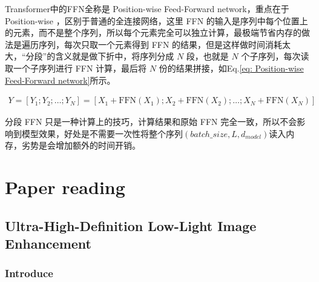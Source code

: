 \documentclass[letterpaper,10pt]{article}
\begin{document}
	Transformer中的FFN全称是 Position-wise Feed-Forward network，重点在于 Position-wise ，区别于普通的全连接网络，这里 FFN 的输入是序列中每个位置上的元素，而不是整个序列，所以每个元素完全可以独立计算，最极端节省内存的做法是遍历序列，每次只取一个元素得到 FFN 的结果，但是这样做时间消耗太大，“分段”的含义就是做下折中，将序列分成 $N$ 段，也就是 $N$ 个子序列，每次读取一个子序列进行 FFN 计算，最后将 $N$ 份的结果拼接，如Eq.\ref{eq: Position-wise Feed-Forward network}所示。
	
	\begin{equation}
		\begin{aligned}
			Y = [Y_1;Y_2;\ldots;Y_N] = [X_1 + \text{FFN}(X_1);X_2 + \text{FFN}(X_2); \ldots; X_N + \text{FFN}(X_N)]
		\end{aligned}
		\label{eq: Position-wise Feed-Forward network}
	\end{equation}
	
	分段 FFN 只是一种计算上的技巧，计算结果和原始 FFN 完全一致，所以不会影响到模型效果，好处是不需要一次性将整个序列$\left(batch\_size , L, d_{model}\right)$读入内存，劣势是会增加额外的时间开销。
	

	
	\section{Paper reading}
	
	\subsection{Ultra-High-Definition Low-Light Image Enhancement}
	
	\subsubsection{Introduce}
	
\end{document}
